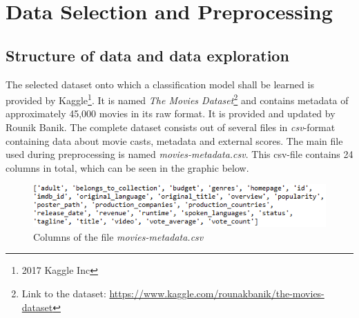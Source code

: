 \chapter{Data Selection and Preprocessing}
\label{cha:data_selection}

\section{Structure of data and data exploration}
\label{sec:data_exploration}
The selected dataset onto which a classification model shall be learned is provided by Kaggle\footnote{2017 Kaggle Inc}. It is named \textit{The Movies Dataset}\footnote{Link to the dataset: \hyperref[https://www.kaggle.com/rounakbanik/the-movies-dataset]{https://www.kaggle.com/rounakbanik/the-movies-dataset}} and contains metadata of approximately 45,000 movies in its raw format. It is provided and updated by Rounik Banik. The complete dataset consists out of several files in \textit{csv}-format containing data about movie casts, metadata and external scores. The main file used during preprocessing is named \textit{movies-metadata.csv}. This csv-file contains 24 columns in total, which can be seen in the graphic below.
\begin{figure}[ht]
	\centering
		\includegraphics[width=\textwidth]{images/Raw_dataset_headers.png}
	\caption{Columns of the file \textit{movies-metadata.csv}}
\end{figure}


